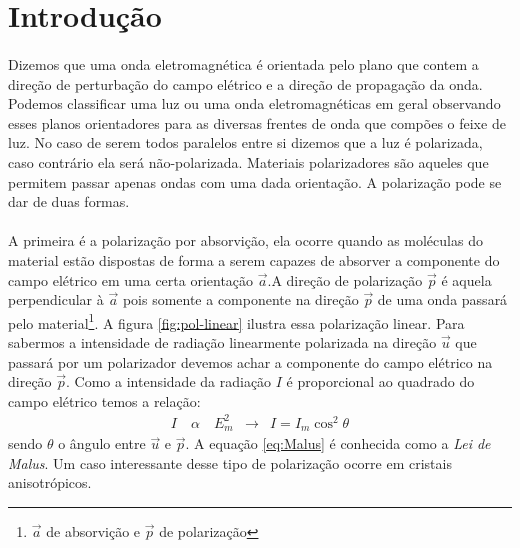 \documentclass[a4paper,11pt]{article}
\begin{document}
\section{Introdução}
\paragraph{} Dizemos que uma onda eletromagnética é orientada pelo plano que contem a direção de perturbação do campo elétrico e a direção de propagação da onda. Podemos classificar uma luz ou uma onda eletromagnéticas em geral observando esses planos orientadores para as diversas frentes de onda que compões o feixe de luz. No caso de serem todos paralelos entre si dizemos que a luz é polarizada, caso contrário ela será não-polarizada. Materiais polarizadores são aqueles que permitem passar apenas ondas com uma dada orientação. A polarização pode se dar de duas formas.

\paragraph{} A primeira é a polarização por absorvição, ela ocorre quando as moléculas do material estão dispostas de forma a serem capazes de absorver a componente do campo elétrico em uma certa orientação $\vec{a}$.A direção de polarização $\vec{p}$ é aquela perpendicular à $\vec{a}$ pois somente a componente na direção $\vec{p}$ de uma onda passará pelo material\footnote{$\vec{a}$ de absorvição e $\vec{p}$ de polarização}. A figura \ref{fig:pol-linear} ilustra essa polarização linear. Para sabermos a intensidade de radiação linearmente polarizada na direção $\vec{u}$ que passará por um polarizador devemos achar a componente do campo elétrico na direção $\vec{p}$. Como a intensidade da radiação $ I $ é proporcional ao quadrado do campo elétrico temos a relação:
\begin{equation}
\begin{array}{lcc}
	I \quad \alpha \quad E_m^2  & \rightarrow & I = I_m \cos ^2 \theta
\end{array}	
\label{eq:Malus}
\end{equation}
sendo $\theta$ o ângulo entre $\vec{u}$ e $\vec{p}$. A equação \ref{eq:Malus} é conhecida como a \emph{Lei de Malus}. Um caso interessante desse tipo de polarização ocorre em cristais anisotrópicos.
\end{document}
